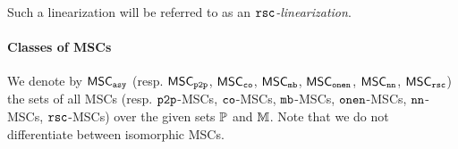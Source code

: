 Such a linearization will be referred to as an \emph{$\mathtt{rsc}$-linearization}.


\paragraph*{Classes of MSCs} 
We denote by $\mathsf{MSC}_{\mathtt{asy}}$ (resp. $\mathsf{MSC}_{\mathtt{p2p}}$, $\mathsf{MSC}_{\mathtt{co}}$, $\mathsf{MSC}_{\mathtt{mb}}$, $\mathsf{MSC}_{\mathtt{onen}}$, $\mathsf{MSC}_{\mathtt{nn}}$, $\mathsf{MSC}_{\mathtt{rsc}}$) the sets of all MSCs (resp. $\mathtt{p2p}$-MSCs, $\mathtt{co}$-MSCs, $\mathtt{mb}$-MSCs, $\mathtt{onen}$-MSCs, $\mathtt{nn}$-MSCs, $\mathtt{rsc}$-MSCs) over the given sets $\mathbb{P}$ and $\mathbb{M}$. Note that we do not differentiate between isomorphic MSCs.
